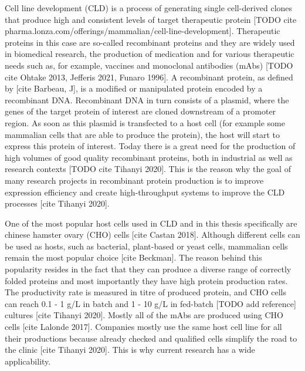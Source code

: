 Cell line development (CLD) is a process of generating single cell-derived clones that produce high and consistent levels of target therapeutic protein [TODO cite pharma.lonza.com/offerings/mammalian/cell-line-development]. Therapeutic proteins in this case are so-called recombinant proteins and they are widely used in biomedical research, the production of medication and for various therapeutic needs such as, for example, vaccines and monoclonal antibodies (mAbs) [TODO cite Ohtake 2013, Jefferis 2021, Funaro 1996]. A recombinant protein, as defined by [cite Barbeau, J], is a modified or manipulated protein encoded by a recombinant DNA. Recombinant DNA in turn consists of a plasmid, where the genes of the target protein of interest are cloned downstream of a promoter region. As soon as this plasmid is transfected to a host cell (for example some mammalian cells that are able to produce the protein), the host will start to express this protein of interest. Today there is a great need for the production of high volumes of good quality recombinant proteins, both in industrial as well as research contexts [TODO cite Tihanyi 2020]. This is the reason why the goal of many research projects in recombinant protein production is to improve expression efficiency and create high-throughput systems to improve the CLD processes [cite Tihanyi 2020].


One of the most popular host cells used in CLD and in this thesis specifically are chinese hamster ovary (CHO) cells [cite Castan 2018]. Although different cells can be used as hosts, such as bacterial, plant-based or yeast cells, mammalian cells remain the most popular choice [cite Beckman]. The reason behind this popularity resides in the fact that they can produce a diverse range of correctly folded proteins and most importantly they have high protein production rates. The productivity rate is measured in titre of produced protein, and CHO cells can reach 0.1 - 1 g/L in batch and 1 - 10 g/L in fed-batch [TODO add reference] cultures [cite Tihanyi 2020]. Mostly all of the mAbs are produced using CHO cells [cite Lalonde 2017]. Companies mostly use the same host cell line for all their productions because already checked and qualified cells simplify the road to the clinic [cite Tihanyi 2020]. This is why current research has a wide applicability.

